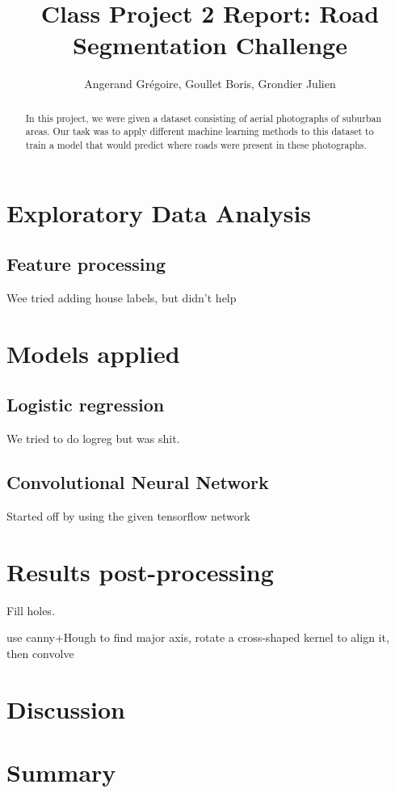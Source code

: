 \documentclass[11pt,conference,compsocconf]{IEEEtran}
\begin{document}
\title{Class Project 2 Report: Road Segmentation Challenge}

\author{
  Angerand Gr\'egoire, Goullet Boris, Grondier Julien 
}

\maketitle

\begin{abstract}
In this project, we were given a dataset consisting of aerial photographs of suburban areas. Our task was to apply different machine learning methods to this dataset to train a model that would predict where roads were present in these photographs.

\end{abstract}

\section{Exploratory Data Analysis}

\subsection{Feature processing}
Wee tried adding house labels, but didn't help

\section{Models applied}

\subsection{Logistic regression}
We tried to do logreg but was shit.

\subsection{Convolutional Neural Network}
Started off by using the given tensorflow network



\section{Results post-processing}
Fill holes.

use canny+Hough to find major axis, rotate a cross-shaped kernel to align it, then convolve

\section{Discussion}


\section{Summary}
\end{document}
